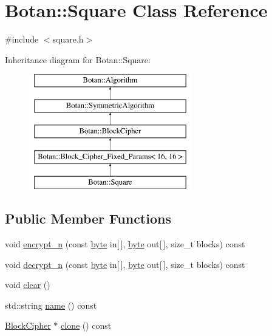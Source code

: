 \hypertarget{classBotan_1_1Square}{\section{Botan\-:\-:Square Class Reference}
\label{classBotan_1_1Square}
}


{\ttfamily \#include $<$square.\-h$>$}

Inheritance diagram for Botan\-:\-:Square\-:\begin{figure}[H]
\begin{center}
\leavevmode
\includegraphics[height=5.000000cm]{classBotan_1_1Square}
\end{center}
\end{figure}
\subsection*{Public Member Functions}
\begin{DoxyCompactItemize}
\item 
void \hyperlink{classBotan_1_1Square_a3455ec66f2735d81b76d1790d3287826}{encrypt\-\_\-n} (const \hyperlink{namespaceBotan_a7d793989d801281df48c6b19616b8b84}{byte} in\mbox{[}$\,$\mbox{]}, \hyperlink{namespaceBotan_a7d793989d801281df48c6b19616b8b84}{byte} out\mbox{[}$\,$\mbox{]}, size\-\_\-t blocks) const 
\item 
void \hyperlink{classBotan_1_1Square_a56a3fd225b235497e0246a8fa5c73569}{decrypt\-\_\-n} (const \hyperlink{namespaceBotan_a7d793989d801281df48c6b19616b8b84}{byte} in\mbox{[}$\,$\mbox{]}, \hyperlink{namespaceBotan_a7d793989d801281df48c6b19616b8b84}{byte} out\mbox{[}$\,$\mbox{]}, size\-\_\-t blocks) const 
\item 
void \hyperlink{classBotan_1_1Square_ab8ccf292a72e5d03669d748d087620c5}{clear} ()
\item 
std\-::string \hyperlink{classBotan_1_1Square_af6d3bc7683673b2cda706f9fd8cc87f3}{name} () const 
\item 
\hyperlink{classBotan_1_1BlockCipher}{Block\-Cipher} $\ast$ \hyperlink{classBotan_1_1Square_ac35d42727e5ba733566ca4cdf74fd4d1}{clone} () const 
\end{DoxyCompactItemize}
